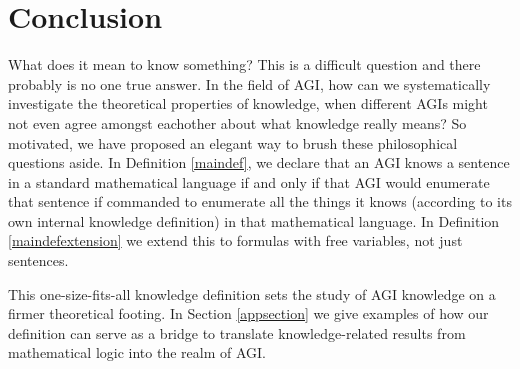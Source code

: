 \documentclass[runningheads]{llncs}
\begin{document}
\section{Conclusion}
\label{conclusionsection}

What does it mean to know something? This is a difficult question and there probably
is no one true answer. In the field of AGI, how can we systematically investigate
the theoretical properties of knowledge, when different AGIs might not even agree
amongst eachother about what knowledge really means? So motivated, we have proposed
an elegant way to brush these philosophical questions aside. In Definition \ref{maindef},
we declare that an AGI knows a sentence in a standard mathematical language if and
only if that AGI would enumerate that sentence if commanded to enumerate all the
things it knows (according to its own internal knowledge definition) in that
mathematical language. In Definition \ref{maindefextension}
we extend this to formulas with free variables, not just sentences.

This one-size-fits-all knowledge definition sets the study of AGI knowledge
on a firmer theoretical footing. In Section \ref{appsection} we give examples
of how our definition can serve as a bridge to translate knowledge-related
results from mathematical logic into the realm of AGI.



\end{document}
